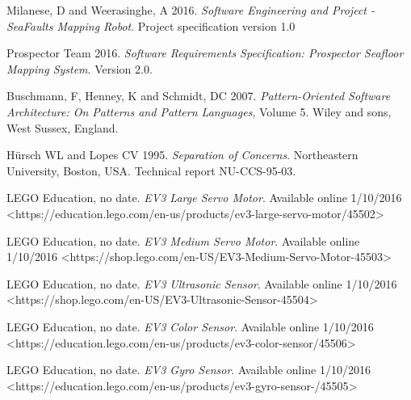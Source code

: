 \documentclass[12pt]{article}
\begin{document}
\begin{thebibliography}{1}

 Milanese, D and Weerasinghe, A 2016. \textit{Software Engineering and Project - SeaFaults Mapping Robot}. Project specification version 1.0

 Prospector Team 2016. \textit{Software Requirements Specification: Prospector Seafloor Mapping System}. Version 2.0.

 Buschmann, F, Henney, K and Schmidt, DC 2007. \textit{Pattern-Oriented Software Architecture: On Patterns and Pattern Languages}, Volume 5. Wiley and sons, West Sussex, England.

 Hürsch WL and Lopes CV 1995. \textit{Separation of Concerns}. Northeastern University, Boston, USA. Technical report NU-CCS-95-03.

 LEGO Education, no date. \textit{EV3 Large Servo Motor}. Available online 1/10/2016 <https://education.lego.com/en-us/products/ev3-large-servo-motor/45502>

 LEGO Education, no date. \textit{EV3 Medium Servo Motor}. Available online 1/10/2016 <https://shop.lego.com/en-US/EV3-Medium-Servo-Motor-45503>

 LEGO Education, no date. \textit{EV3 Ultrasonic Sensor}. Available online 1/10/2016 <https://shop.lego.com/en-US/EV3-Ultrasonic-Sensor-45504>

 LEGO Education, no date. \textit{EV3 Color Sensor}. Available online 1/10/2016 <https://education.lego.com/en-us/products/ev3-color-sensor/45506>

 LEGO Education, no date. \textit{EV3 Gyro Sensor}. Available online 1/10/2016 <https://education.lego.com/en-us/products/ev3-gyro-sensor-/45505>

 \end{thebibliography}
 
\end{document}
